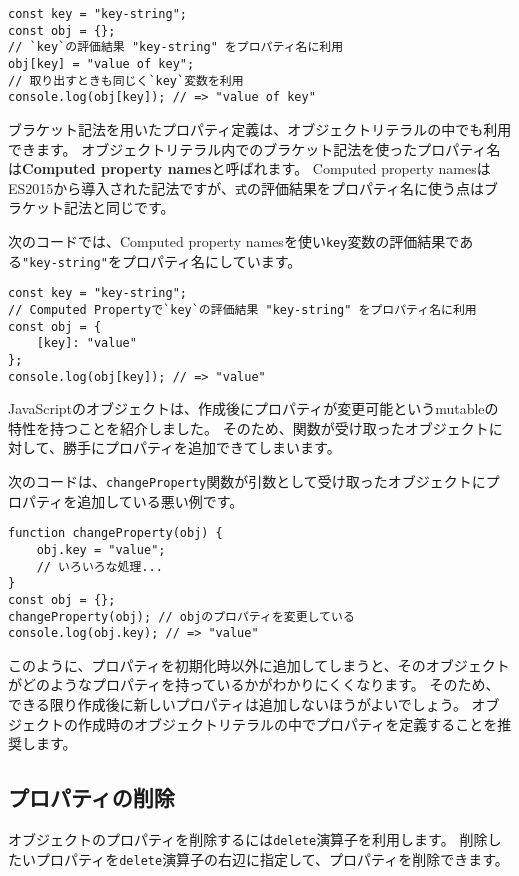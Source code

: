\begin{lstlisting}
const key = "key-string";
const obj = {};
// `key`の評価結果 "key-string" をプロパティ名に利用
obj[key] = "value of key";
// 取り出すときも同じく`key`変数を利用
console.log(obj[key]); // => "value of key"
\end{lstlisting}

ブラケット記法を用いたプロパティ定義は、オブジェクトリテラルの中でも利用できます。
オブジェクトリテラル内でのブラケット記法を使ったプロパティ名は\textbf{Computed
property names}と呼ばれます。 Computed property
namesはES2015から導入された記法ですが、\texttt{式}の評価結果をプロパティ名に使う点はブラケット記法と同じです。

次のコードでは、Computed property
namesを使い\texttt{key}変数の評価結果である\texttt{"key-string"}をプロパティ名にしています。

\begin{lstlisting}
const key = "key-string";
// Computed Propertyで`key`の評価結果 "key-string" をプロパティ名に利用
const obj = {
    [key]: "value"
};
console.log(obj[key]); // => "value"
\end{lstlisting}

JavaScriptのオブジェクトは、作成後にプロパティが変更可能というmutableの特性を持つことを紹介しました。
そのため、関数が受け取ったオブジェクトに対して、勝手にプロパティを追加できてしまいます。

次のコードは、\texttt{changeProperty}関数が引数として受け取ったオブジェクトにプロパティを追加している悪い例です。

\begin{lstlisting}
function changeProperty(obj) {
    obj.key = "value";
    // いろいろな処理...
}
const obj = {};
changeProperty(obj); // objのプロパティを変更している
console.log(obj.key); // => "value"
\end{lstlisting}

このように、プロパティを初期化時以外に追加してしまうと、そのオブジェクトがどのようなプロパティを持っているかがわかりにくくなります。
そのため、できる限り作成後に新しいプロパティは追加しないほうがよいでしょう。
オブジェクトの作成時のオブジェクトリテラルの中でプロパティを定義することを推奨します。

\hypertarget{remove-property}{%
\subsection{プロパティの削除}\label{remove-property}}

オブジェクトのプロパティを削除するには\texttt{delete}演算子を利用します。
削除したいプロパティを\texttt{delete}演算子の右辺に指定して、プロパティを削除できます。

